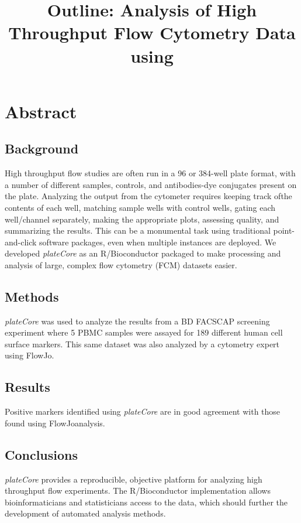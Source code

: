 \documentclass[12pt]{article}
\title{Outline: Analysis of High Throughput Flow Cytometry Data using \Rpackage{plateCore}}
\newcommand{\Rpackage}[1]{{\textit{#1}}}
\begin{document}
\maketitle

\clearpage
\section*{Abstract}
\subsection*{Background}
High throughput flow studies are often run in a 96 or 384-well plate format, with a number of different samples, 
controls, and antibodies-dye conjugates present on the plate. Analyzing the output from the cytometer requires keeping track ofthe contents
of each well, matching sample wells with control wells, gating each well/channel separately, making the appropriate plots, assessing quality, and
summarizing the results. This can be a monumental task using traditional point-and-click software packages, even when multiple instances are
deployed. We developed \Rpackage{plateCore} as an R/Bioconductor packaged to make processing and analysis of large, complex flow cytometry (FCM) datasets
easier. 

\subsection*{Methods}
\Rpackage{plateCore} was used to analyze the results from a BD FACS\texttrademark CAP screening experiment where 5 PBMC samples 
were assayed for 189 different human cell surface markers. 
This same dataset was also analyzed by a cytometry expert using FlowJo\texttrademark.

\subsection*{Results}
Positive markers identified using \Rpackage{plateCore} are in good agreement with those found using FlowJo\texttrademark analysis.

\subsection*{Conclusions}
\Rpackage{plateCore} provides a reproducible, objective platform for analyzing high throughput flow experiments. The R/Bioconductor 
implementation allows bioinformaticians and statisticians access to the data, which should further the development of automated
analysis methods.
\end{document}
